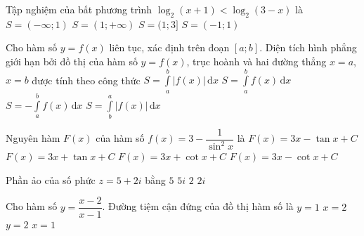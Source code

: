 \begin{ex}%
	Tập nghiệm của bất phương trình $\log_2 (x+1)<\log_2 (3-x)$ là
	\choice
	{$S=(-\infty;1)$}
	{$S=(1;+\infty)$}
	{$S=(1;3]$}
	{\True $S=(-1;1)$}
\end{ex}

\begin{ex}%
	Cho hàm số $y=f(x)$ liên tục, xác định trên đoạn $[a;b]$. Diện tích hình phẳng giới hạn bởi đồ thị của hàm số $y=f(x)$, trục hoành và hai đường thẳng $x=a$, $x=b$ được tính theo công thức
	\choice
	{\True $S=\displaystyle\int\limits_a^b \left|f(x)\right|\mathrm{\,d}x$}
	{$S=\displaystyle\int\limits_a^b f(x)\mathrm{\,d}x$}
	{$S=-\displaystyle\int\limits_a^b f(x)\mathrm{\,d}x$}
	{$S=\displaystyle\int\limits_b^a \left|f(x)\right|\mathrm{\,d}x$}
\end{ex}

\begin{ex}%
	Nguyên hàm $F(x)$ của hàm số $f(x)=3-\dfrac{1}{\sin^2 x}$ là
	\choice
	{$F(x)=3x-\tan x+C$}
	{$F(x)=3x+\tan x+C$}
	{\True $F(x)=3x+\cot x+C$}
	{$F(x)=3x-\cot x+C$}
\end{ex}

\begin{ex}%
	Phần ảo của số phức $z=5+2i$ bằng
	\choice
	{$5$}
	{$5i$}
	{\True $2$}
	{$2i$}
\end{ex}

\begin{ex}%
	Cho hàm số $y=\dfrac{x-2}{x-1}$. Đường tiệm cận đứng của đồ thị hàm số là
	\choice
	{$y=1$}
	{$x=2$}
	{$y=2$}
	{\True $x=1$}
\end{ex}

